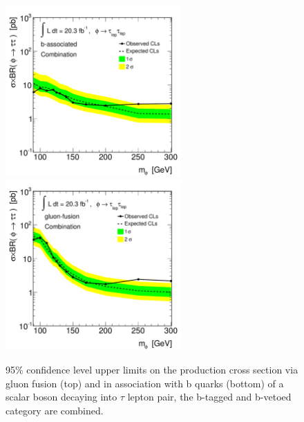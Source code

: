 \begin{figure}[tp]
  \centering
 \includegraphics[width=0.6\textwidth]{figure/limits_tesi/limit_Xsec_bbA_comb.pdf}
 \includegraphics[width=0.6\textwidth]{figure/limits_tesi/limit_Xsec_ggA_comb.pdf}
  \caption{95\% confidence level upper limits on the production cross section via gluon fusion  (top) and 
	in association with b quarks (bottom) of a scalar boson decaying into  $\tau$ lepton pair,  the b-tagged and b-vetoed category 
	are combined.}
\label{fig:limit_xs}
\end{figure}


